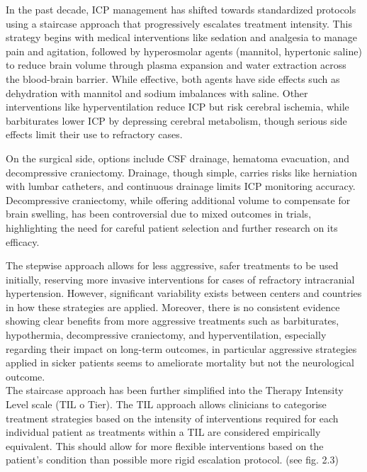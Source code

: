 In the past decade, ICP management has shifted towards standardized protocols using a staircase approach\cite{stocchettiTraumaticIntracranialHypertension2014a} that progressively escalates treatment intensity. This strategy begins with medical interventions like sedation and analgesia to manage pain and agitation, followed by hyperosmolar agents (mannitol, hypertonic saline) to reduce brain volume through plasma expansion and water extraction across the blood-brain barrier. While effective, both agents have side effects such as dehydration with mannitol and sodium imbalances with saline. Other interventions like hyperventilation reduce ICP but risk cerebral ischemia, while barbiturates lower ICP by depressing cerebral metabolism, though serious side effects limit their use to refractory cases.

On the surgical side, options include CSF drainage, hematoma evacuation, and decompressive craniectomy. Drainage, though simple, carries risks like herniation with lumbar catheters, and continuous drainage limits ICP monitoring accuracy. Decompressive craniectomy, while offering additional volume to compensate for brain swelling, has been controversial due to mixed outcomes in trials, highlighting the need for careful patient selection and further research on its efficacy.

The stepwise approach allows for less aggressive, safer treatments to be used initially, reserving more invasive interventions for cases of refractory intracranial hypertension. However, significant variability exists between centers and countries in how these strategies are applied. Moreover, there is no consistent evidence showing clear benefits from more aggressive treatments such as barbiturates, hypothermia, decompressive craniectomy, and hyperventilation, especially regarding their impact on long-term outcomes, in particular aggressive strategies applied in sicker patients seems to ameliorate mortality but not the neurological outcome\cite{robbaTreatmentsIntracranialHypertension2023a}.\\

The staircase approach has been further simplified into the Therapy Intensity Level scale (TIL o Tier)\cite{zuercherReliabilityValidityTherapy2016}. The TIL approach allows clinicians to categorise treatment strategies based on the intensity of interventions required for each individual patient as treatments within a TIL are considered empirically equivalent\cite{hawrylukManagementAlgorithmPatients2019a}. This should allow for more flexible interventions based on the patient’s condition than possible more rigid escalation protocol. (see fig. 2.3)

